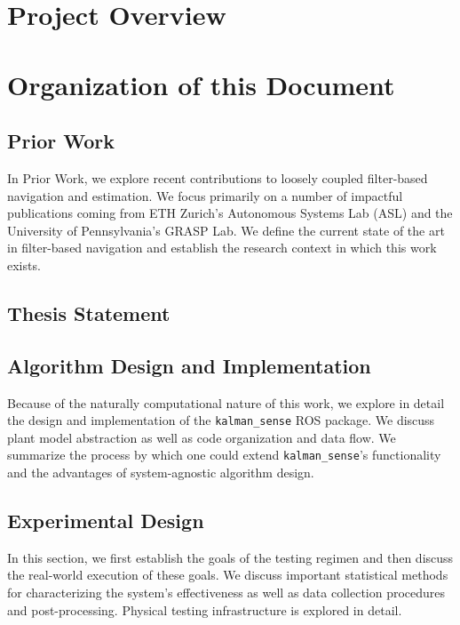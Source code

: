 \section{Project Overview}


\section{Organization of this Document}

\subsection*{Prior Work}

In Prior Work, we explore recent contributions to loosely coupled filter-based navigation and estimation. We focus primarily on a number of impactful publications coming from ETH Zurich's Autonomous Systems Lab (ASL) and the University of Pennsylvania's GRASP Lab. We define the current state of the art in filter-based navigation and establish the research context in which this work exists.

\subsection*{Thesis Statement}
\subsection*{Algorithm Design and Implementation}

Because of the naturally computational nature of this work, we explore in detail the design and implementation of the \texttt{kalman\_sense} ROS package. We discuss plant model abstraction as well as code organization and data flow. We summarize the process by which one could extend \texttt{kalman\_sense}'s functionality and the advantages of system-agnostic algorithm design.

\subsection*{Experimental Design}

In this section, we first establish the goals of the testing regimen and then discuss the real-world execution of these goals. We discuss important statistical methods for characterizing the system's effectiveness as well as data collection procedures and post-processing. Physical testing infrastructure is explored in detail.

